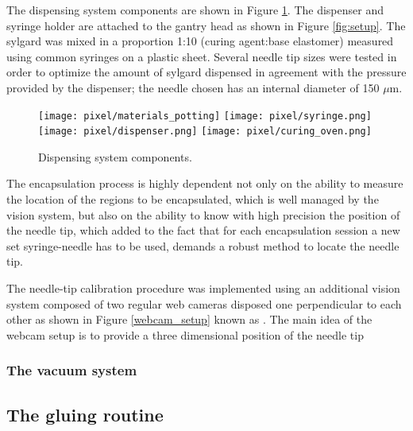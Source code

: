 The dispensing system components are shown in Figure \ref{fig:potting_comp}. The dispenser and syringe holder are attached to the gantry head as shown in Figure \ref{fig:setup}. The sylgard was mixed in a proportion 1:10 (curing agent:base elastomer) measured using common syringes on a plastic sheet. Several needle tip sizes were tested in order to optimize the amount of sylgard dispensed in agreement with the pressure provided by the dispenser; the needle chosen has an internal diameter of 150 $\mu$m.

\begin{figure}[h]
  \begin{center}
    \texttt{[image: pixel/materials\_potting]}
    \texttt{[image: pixel/syringe.png]}\\
    \texttt{[image: pixel/dispenser.png]}
    \texttt{[image: pixel/curing\_oven.png]}
    \caption[Dispensing system components.]{Dispensing system components.}\label{fig:potting_comp}
  \end{center}
\end{figure}

The encapsulation process is highly dependent not only on the ability to measure the location of the regions to be encapsulated, which is well managed by the vision system, but also on the ability to know with high precision the position of the needle tip, which added to the fact that for each encapsulation session a new set syringe-needle has to be used, demands a robust method to locate the needle tip.

The needle-tip calibration procedure was implemented using an additional vision system composed of two regular web cameras disposed one perpendicular to each other as shown in Figure \ref{webcam_setup} known as . The main idea of the webcam setup is to provide a three dimensional position of the needle tip     

                  



\subsubsection*{The vacuum system}



\subsection{The gluing routine}

